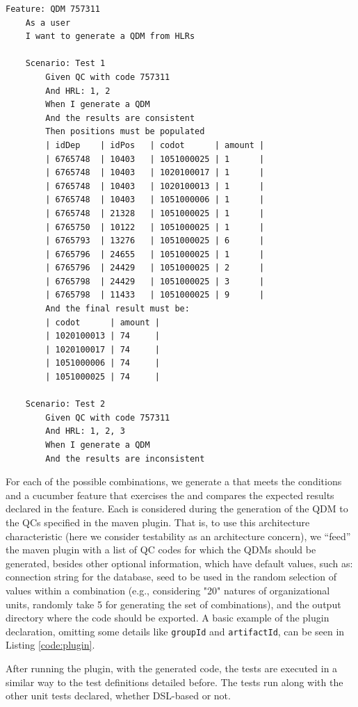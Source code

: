 \begin{lstlisting}[frame=single, language=Cucumber, caption={\it Cucumber feature}, label={code:cucumber}]
Feature: QDM 757311
	As a user
	I want to generate a QDM from HLRs

	Scenario: Test 1
		Given QC with code 757311
		And HRL: 1, 2
		When I generate a QDM
		And the results are consistent
		Then positions must be populated
		| idDep    | idPos   | codot      | amount |
		| 6765748  | 10403   | 1051000025 | 1      |
		| 6765748  | 10403   | 1020100017 | 1      |
		| 6765748  | 10403   | 1020100013 | 1      |
		| 6765748  | 10403   | 1051000006 | 1      |
		| 6765748  | 21328   | 1051000025 | 1      |
		| 6765750  | 10122   | 1051000025 | 1      |    
		| 6765793  | 13276   | 1051000025 | 6      |
		| 6765796  | 24655   | 1051000025 | 1      |
		| 6765796  | 24429   | 1051000025 | 2      |
		| 6765798  | 24429   | 1051000025 | 3      |
		| 6765798  | 11433   | 1051000025 | 9      |   
		And the final result must be:
		| codot      | amount |
		| 1020100013 | 74     |
		| 1020100017 | 74     |
		| 1051000006 | 74     |
		| 1051000025 | 74     |

	Scenario: Test 2
		Given QC with code 757311
		And HRL: 1, 2, 3
		When I generate a QDM
		And the results are inconsistent    
\end{lstlisting}

For each of the possible combinations, we generate a \shc that meets the conditions 
and a cucumber feature that exercises the \shc and compares the expected results declared in the feature. 
Each \shc is considered during the generation of the QDM to the QCs specified in the 
maven plugin. That is, to use this architecture characteristic (here we consider testability as an 
architecture concern), we ``feed'' the maven plugin with a list of QC codes for which the QDMs should be generated, 
besides other optional information, which have default values, such as: connection string for the database, 
seed to be used in the random selection of values within a combination (e.g., considering "20" natures of 
organizational units, randomly take 5 for generating the set of combinations), and the output directory 
where the code should be exported. A basic example of the plugin declaration, omitting some details like 
\texttt{groupId} and \texttt{artifactId}, can be seen in Listing \ref{code:plugin}.

After running the plugin, with the generated code, the tests are executed in a similar way to the test 
definitions detailed before. The tests run along with the other unit tests declared, 
whether DSL-based or not.
